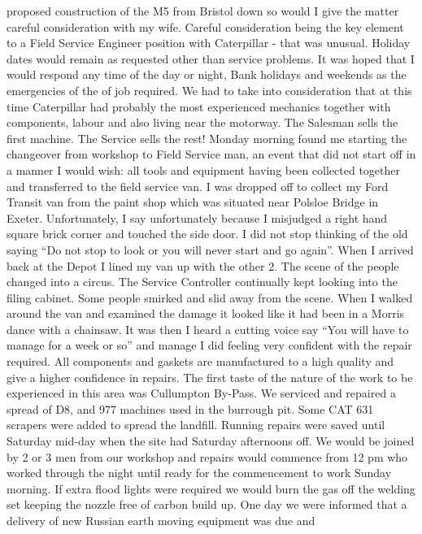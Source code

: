 proposed construction of the M5 from Bristol down so would I give the matter
careful consideration with my wife.  Careful consideration being the key
element to a Field Service Engineer position with Caterpillar - that was
unusual.  Holiday dates would remain as requested other than service problems.
It was hoped that I would respond any time of the day or night, Bank holidays
and weekends as the emergencies of the of job required.  We had to take into
consideration that at this time Caterpillar had probably the most experienced
mechanics together with components, labour and also living near the motorway.
The Salesman sells the first machine.  The Service sells the rest!  Monday
morning found me starting the changeover from workshop to Field Service man, an
event that did not start off in a manner I would wish:  all tools and equipment
having been collected together and transferred to the field service van. I was
dropped off to collect my Ford Transit van from the paint shop which was
situated near Polsloe Bridge in Exeter.  Unfortunately, I say unfortunately
because I misjudged a right hand square brick corner and touched the side door.
I did not stop thinking of the old saying ``Do not stop to look or you will
never start and go again''.  When I arrived back at the Depot I lined my van up
with the other 2.  The scene of the people changed into a circus.  The Service
Controller continually kept looking into the filing cabinet.  Some people
smirked and slid away from the scene.  When I walked around the van and
examined the damage it looked like it had been in a Morris dance with a
chainsaw.  It was then I heard a cutting voice say ``You will have to manage
for a week or so'' and manage I did feeling very confident with the repair
required.   All components and gaskets are manufactured to a high quality and
give a higher confidence in repairs. The first taste of the nature of the work
to be experienced in this area was Cullumpton By-Pass.  We serviced and
repaired a spread of D8, and 977 machines used in the burrough             pit.
Some CAT 631 scrapers were added to spread the landfill.   Running repairs were
saved until Saturday mid-day when the site had Saturday afternoons off.  We
would be joined by 2 or 3 men from our workshop and repairs would commence from
12 pm who worked through the night until ready for the commencement to work
Sunday morning.   If extra flood lights were required  we would burn the gas
off the welding set keeping the nozzle free of carbon build up.  One day we
were informed that a delivery of new Russian earth moving equipment was due and
